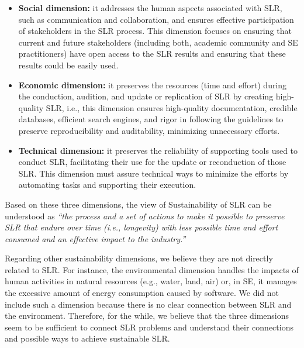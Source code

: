 \documentclass{article}
\begin{document}
\begin{itemize}[leftmargin=*]

\item \textbf{Social dimension:} it addresses the human aspects associated with SLR, such as communication and collaboration, and ensures effective participation of stakeholders in the SLR process. This dimension focuses on ensuring that current and future stakeholders (including both, academic community and SE practitioners) have open access to the SLR results and ensuring that these results could be easily used.

\item \textbf{Economic dimension:} it preserves the resources (time and effort) during the conduction, audition, and update or replication of SLR by creating high-quality SLR, i.e., this dimension ensures high-quality documentation, credible databases, efficient search engines, and rigor in following the guidelines to preserve reproducibility and auditability, minimizing unnecessary efforts. 

\item \textbf{Technical dimension:} it preserves the reliability of supporting tools used to conduct SLR, facilitating their use for the update or reconduction of those SLR. This dimension must assure technical ways to minimize the efforts by automating tasks and supporting their execution.

\end{itemize}

Based on these three dimensions, the view of Sustainability of SLR can be understood as \textit{``the process and a set of actions to make it possible to preserve SLR that endure over time (i.e., longevity) with less possible time and effort consumed and an effective impact to the industry.''}

Regarding other sustainability dimensions, we believe they are not directly related to SLR. For instance, the environmental dimension handles the impacts of human activities in natural resources (e.g., water, land, air) or, in SE, it manages the excessive amount of energy consumption caused by software. We did not include such a dimension because there is no clear connection between SLR and the environment. Therefore, for the while, we believe that the three dimensions seem to be sufficient to connect SLR problems and understand their connections and possible ways to achieve sustainable SLR.
\end{document}
